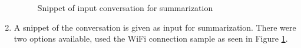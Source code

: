 \begin{enumerate}
\begin {figure}[h!h]
            \caption{Snippet of input conversation for summarization}
            \label{summinput}
        \end {figure}
    \clearpage
    \newpage
    \item A snippet of the conversation is given as input for summarization. There were two options available, used the WiFi connection sample as seen in Figure \ref{summinput}.
        

\end{enumerate}
